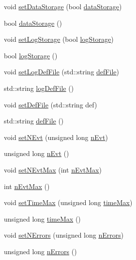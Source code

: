 \begin{DoxyCompactItemize}
void \hyperlink{classOptions_ae6f39f4b0b4bd260fbb5a2f0b5f4786e}{set\+Data\+Storage} (bool \hyperlink{classOptions_aed7799d10139fa542055b982cb820192}{data\+Storage})
\item 
bool \hyperlink{classOptions_aed7799d10139fa542055b982cb820192}{data\+Storage} ()
\item 
void \hyperlink{classOptions_a96f0288f5317cf371589f4db07e913b0}{set\+Log\+Storage} (bool \hyperlink{classOptions_a33735fffe17485937ab7579d8716b7ee}{log\+Storage})
\item 
bool \hyperlink{classOptions_a33735fffe17485937ab7579d8716b7ee}{log\+Storage} ()
\item 
void \hyperlink{classOptions_a52e2995912a71f51c230dd6bf28b6a94}{set\+Log\+Def\+File} (std\+::string \hyperlink{classOptions_aca5ce5262ca717eaad5ff9db92ad1948}{def\+File})
\item 
std\+::string \hyperlink{classOptions_a5d362ec7f7969bd72c3c94b8e3d5ba97}{log\+Def\+File} ()
\item 
void \hyperlink{classOptions_a3c8bed9867ac5805489d78061e55bd1a}{set\+Def\+File} (std\+::string def)
\item 
std\+::string \hyperlink{classOptions_aca5ce5262ca717eaad5ff9db92ad1948}{def\+File} ()
\item 
void \hyperlink{classOptions_ae6a0fdaa736948f5040deb3eb6889268}{set\+N\+Evt} (unsigned long \hyperlink{classOptions_ad769b256263a4ac24dd6f989ae724ab7}{n\+Evt})
\item 
unsigned long \hyperlink{classOptions_ad769b256263a4ac24dd6f989ae724ab7}{n\+Evt} ()
\item 
void \hyperlink{classOptions_a6d732c0591188469287581bac8a4e3cd}{set\+N\+Evt\+Max} (int \hyperlink{classOptions_ad1f3b03d734c806a2feca418b26bcc9b}{n\+Evt\+Max})
\item 
int \hyperlink{classOptions_ad1f3b03d734c806a2feca418b26bcc9b}{n\+Evt\+Max} ()
\item 
void \hyperlink{classOptions_aaa921f68319ea83b5c5a13e37a831c7a}{set\+Time\+Max} (unsigned long \hyperlink{classOptions_a4569b8790af48109c8639bec7b626fa6}{time\+Max})
\item 
unsigned long \hyperlink{classOptions_a4569b8790af48109c8639bec7b626fa6}{time\+Max} ()
\item 
void \hyperlink{classOptions_a45368b495036869c67fe0e6bf9abc4e6}{set\+N\+Errors} (unsigned long \hyperlink{classOptions_acc6474323f0bbe17fa844e9a086b90b8}{n\+Errors})
\item 
unsigned long \hyperlink{classOptions_acc6474323f0bbe17fa844e9a086b90b8}{n\+Errors} ()

\end{DoxyCompactItemize}
